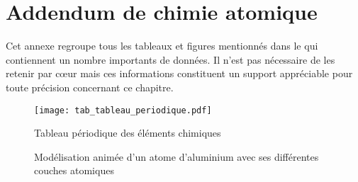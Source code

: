 

\begin{comment}

\documentclass[a4paper, 11pt, twoside]{memoir}

\usepackage{AOCDTF}



	\openleft %

\end{comment}

\chapter{Addendum de chimie atomique}
\label{ann:addendum_chimie_atomique}

Cet annexe regroupe tous les tableaux et figures mentionnés dans le  qui contiennent un nombre importants de données. Il n'est pas nécessaire de les retenir par c\oe{}ur mais ces informations constituent un support appréciable pour toute précision concernant ce chapitre.



\begin{landscape}
	\begin{figure}
	\caption{Tableau périodique des éléments chimiques}
	\label{tab:tableau_periodique}
		\begin{center}
			\texttt{[image: tab\_tableau\_periodique.pdf]} 
		\end{center}
	\end{figure}
\end{landscape}



\begin{figure}[!h]
		\centering
		\caption{Modélisation animée d'un atome d'aluminium avec ses différentes couches atomiques}
		\label{fig:aluminium_modelisation_animee}
\end{figure}

%